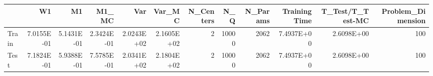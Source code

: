 \begin{tabular}{lrrrrrrrrrrr}
\toprule
{} &         W1 &         M1 &      M1\_MC &        Var &     Var\_MC &  N\_Centers &    N\_Q &  N\_Params &  Training Time &  T\_Test/T\_Test-MC &  Problem\_Dimension \\
\midrule
Train & 7.0155E-01 & 5.1431E-01 & 2.3424E-01 & 2.0243E+02 & 2.1605E+02 &          2 &  10000 &      2062 &     7.4937E+00 &        2.6098E+00 &                100 \\
Test  & 7.1824E-01 & 5.9388E-01 & 7.5785E-01 & 2.0341E+02 & 2.1804E+02 &          2 &  10000 &      2062 &     7.4937E+00 &        2.6098E+00 &                100 \\
\bottomrule
\end{tabular}
